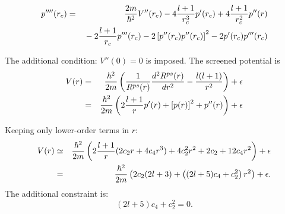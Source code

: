 \documentclass[12pt,a4paper]{article}
\begin{document}
\begin{eqnarray}
p''''(r_c) & = & {2m\over\hbar^2}V''(r_c) - 4 {l+1\over r^3_c}p'(r_c)
                 + 4{l+1\over r^2_c}p''(r) \nonumber \\ & & \mbox{} 
            - 2{l+1\over r_c}p'''(r_c)
           - 2 \left[p''(r_c)p''(r_c)\right]^2 -2 p'(r_c)p'''(r_c)
\end{eqnarray}

The additional condition: $V''(0)=0$ is imposed. 
The screened potential is
\begin{eqnarray}
V(r)&=&{\hbar^2\over2m}\left({1\over R^{ps}(r)}{d^2R^{ps}(r)\over dr^2} 
     - {l(l+1)\over r^2}\right)+\epsilon \\
    &=&{\hbar^2\over2m}\left( 2{l+1\over r} p'(r)+\left[p(r)\right]^2+p''(r)
       \right)+\epsilon
\end{eqnarray}

Keeping only lower-order terms in $r$:
\begin{eqnarray}
V(r) &\simeq&{\hbar^2\over2m}\left( 2{l+1\over r} (2c_2r + 4c_4r^3) 
               + 4c_2^2r^2 + 2c_2 + 12c_4r^2\right) + \epsilon \\
     &   =  & {\hbar^2\over2m}\left( 2c_2(2l+3) + 
              \left((2l+5)c_4+c_2^2\right) r^2\right)+ \epsilon .
\end{eqnarray}
The additional constraint is:
\begin{equation}
(2l+5)c_4+c_2^2=0.
\end{equation}
\end{document}
